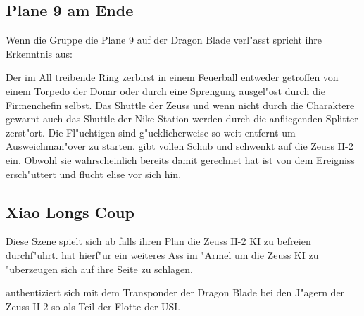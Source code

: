 
\subsection{Plane 9 am Ende}
Wenn die Gruppe die Plane 9 auf der Dragon Blade verl"asst spricht \xl{} ihre Erkenntnis aus:


Der im All treibende Ring zerbirst in einem Feuerball entweder getroffen von einem Torpedo der Donar oder durch eine Sprengung ausgel"ost durch die Firmenchefin selbst. Das Shuttle der Zeuss und wenn nicht durch die Charaktere gewarnt auch das Shuttle der Nike Station werden durch die anfliegenden Splitter zerst"ort. Die Fl"uchtigen sind g"ucklicherweise so weit entfernt um Ausweichman"over zu starten. \xl{} gibt vollen Schub und schwenkt auf die Zeuss II-2 ein. Obwohl sie wahrscheinlich bereits damit gerechnet hat ist \ml{} von dem Ereigniss ersch"uttert und flucht elise vor sich hin.

\subsection[\xl{}s Coup]{Xiao Longs Coup}
Diese Szene spielt sich ab falls \xl{} ihren Plan die Zeuss II-2 KI zu befreien durchf"uhrt. \xl{} hat hierf"ur ein weiteres Ass im "Armel um die Zeuss KI zu "uberzeugen sich auf ihre Seite zu schlagen.

\xl{} authentiziert sich mit dem Transponder der Dragon Blade bei den J"agern der Zeuss II-2 so als Teil der Flotte der USI. 

